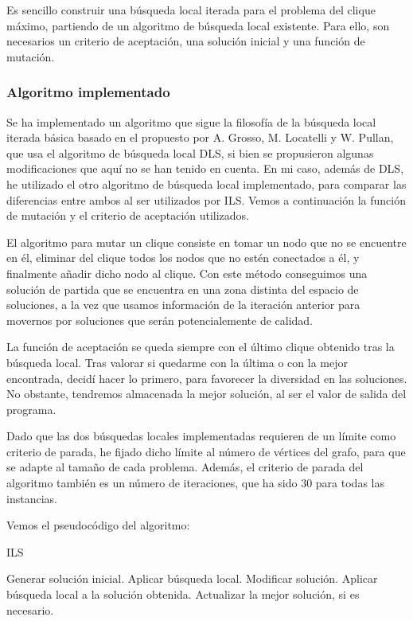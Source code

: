 Es sencillo construir una búsqueda local iterada para el problema del clique máximo,
partiendo de un algoritmo de búsqueda local existente. Para ello, son necesarios un
criterio de aceptación, una solución inicial y una función de mutación.

\subsubsection{Algoritmo implementado}

Se ha implementado un algoritmo que sigue la filosofía de la búsqueda local iterada
básica basado en el propuesto por A. Grosso, M. Locatelli y W. Pullan, que usa el
algoritmo de búsqueda local DLS, si bien se propusieron algunas modificaciones que
aquí no se han tenido en cuenta. En mi caso, además de DLS, he utilizado el otro
algoritmo de búsqueda local implementado, para comparar las diferencias entre ambos
al ser utilizados por ILS. Vemos a continuación la función de mutación y el criterio
de aceptación utilizados.

El algoritmo para mutar un clique consiste en tomar un nodo que no se encuentre en él,
eliminar del clique todos los nodos que no estén conectados a él, y finalmente añadir
dicho nodo al clique. Con este método conseguimos una solución de partida que se encuentra
en una zona distinta del espacio de soluciones, a la vez que usamos información de la
iteración anterior para movernos por soluciones que serán potencialemente de calidad.

La función de aceptación se queda siempre con el último clique obtenido tras la búsqueda local.
Tras valorar si quedarme con la última o con la mejor encontrada, decidí hacer lo primero,
para favorecer la diversidad en las soluciones. No obstante, tendremos almacenada la mejor
solución, al ser el valor de salida del programa.

Dado que las dos búsquedas locales implementadas requieren de un límite como criterio de
parada, he fijado dicho límite al número de vértices del grafo, para que se adapte al
tamaño de cada problema. Además, el criterio de parada del algoritmo también es un número
de iteraciones, que ha sido $30$ para todas las instancias.

Vemos el pseudocódigo del algoritmo:

\begin{algorithm}[H]
\caption{ILS}
  \begin{algorithmic}
    \State Generar solución inicial.
    \State Aplicar búsqueda local.
    \Repeat
      \State Modificar solución.
      \State Aplicar búsqueda local a la solución obtenida.
      \State Actualizar la mejor solución, si es necesario.
  \end{algorithmic}
\end{algorithm}

